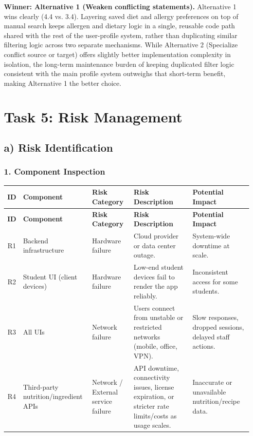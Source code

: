 \documentclass[11pt]{article}
\begin{document}
\textbf{Winner: Alternative 1 (Weaken conflicting statements).} Alternative 1 wins clearly (4.4 vs. 3.4). Layering saved diet and allergy preferences on top of manual search keeps allergen and dietary logic in a single, reusable code path shared with the rest of the user-profile system, rather than duplicating similar filtering logic across two separate mechanisms. While Alternative 2 (Specialize conflict source or target) offers slightly better implementation complexity in isolation, the long-term maintenance burden of keeping duplicated filter logic consistent with the main profile system outweighs that short-term benefit, making Alternative 1 the better choice.

\section{Task 5: Risk Management}

\subsection{a) Risk Identification}

\subsubsection{1. Component Inspection}

\begin{longtable}{|c|p{2.3cm}|p{2cm}|p{4.5cm}|p{3cm}|}
\hline
\textbf{ID} & \textbf{Component} & \textbf{Risk Category} & \textbf{Risk Description} & \textbf{Potential Impact} \\
\hline
\endfirsthead

\hline
\textbf{ID} & \textbf{Component} & \textbf{Risk Category} & \textbf{Risk Description} & \textbf{Potential Impact} \\
\hline
\endhead

\hline
\endfoot

\hline
\endlastfoot

R1 & Backend infrastructure & Hardware failure & Cloud provider or data center outage. & System-wide downtime at scale. \\
\hline

R2 & Student UI (client devices) & Hardware failure & Low-end student devices fail to render the app reliably. & Inconsistent access for some students. \\
\hline

R3 & All UIs & Network failure & Users connect from unstable or restricted networks (mobile, office, VPN). & Slow responses, dropped sessions, delayed staff actions. \\
\hline

R4 & Third-party nutrition/ingredient APIs & Network / External service failure & API downtime, connectivity issues, license expiration, or stricter rate limits/costs as usage scales. & Inaccurate or unavailable nutrition/recipe data. \\
\hline

\end{longtable}
\end{document}
